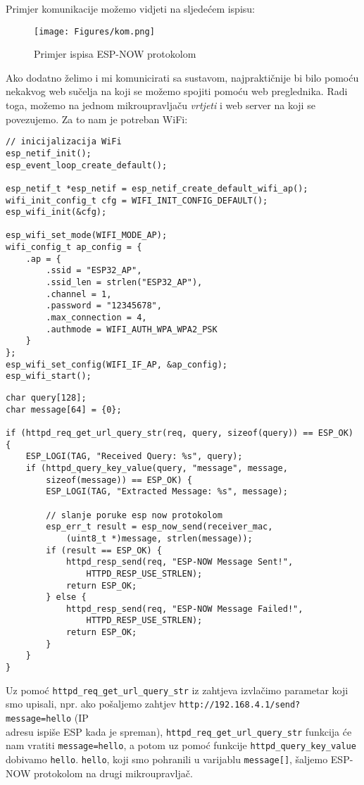 \documentclass[seminarskirad]{fer}
\begin{document}
Primjer komunikacije možemo vidjeti na sljedećem ispisu:

\begin{figure}[h!]
  \centering
  \texttt{[image: Figures/kom.png]} 
  \caption{Primjer ispisa ESP-NOW protokolom}
  \label{slk:kom}
\end{figure}

Ako dodatno želimo i mi komunicirati sa sustavom, najpraktičnije bi bilo pomoću nekakvog web sučelja na koji se možemo spojiti pomoću web preglednika. Radi toga, možemo na jednom mikroupravljaču \textit{vrtjeti} i web server na koji se povezujemo. Za to nam je potreban WiFi:

\begin{lstlisting}[caption=Kreiranje WiFi AP-a]
// inicijalizacija WiFi
esp_netif_init();
esp_event_loop_create_default();

esp_netif_t *esp_netif = esp_netif_create_default_wifi_ap();
wifi_init_config_t cfg = WIFI_INIT_CONFIG_DEFAULT();
esp_wifi_init(&cfg);

esp_wifi_set_mode(WIFI_MODE_AP);
wifi_config_t ap_config = {
    .ap = {
        .ssid = "ESP32_AP",
        .ssid_len = strlen("ESP32_AP"),
        .channel = 1,
        .password = "12345678",
        .max_connection = 4,
        .authmode = WIFI_AUTH_WPA_WPA2_PSK
    }
};
esp_wifi_set_config(WIFI_IF_AP, &ap_config);
esp_wifi_start();
\end{lstlisting}

\begin{lstlisting}[caption=\textit{Handler} za http zahtjev]
char query[128];
char message[64] = {0};
    
if (httpd_req_get_url_query_str(req, query, sizeof(query)) == ESP_OK) {
    ESP_LOGI(TAG, "Received Query: %s", query);
    if (httpd_query_key_value(query, "message", message, 
        sizeof(message)) == ESP_OK) {
        ESP_LOGI(TAG, "Extracted Message: %s", message);

        // slanje poruke esp now protokolom
        esp_err_t result = esp_now_send(receiver_mac, 
            (uint8_t *)message, strlen(message));
        if (result == ESP_OK) {
            httpd_resp_send(req, "ESP-NOW Message Sent!", 
                HTTPD_RESP_USE_STRLEN);
            return ESP_OK;
        } else {
            httpd_resp_send(req, "ESP-NOW Message Failed!", 
                HTTPD_RESP_USE_STRLEN);
            return ESP_OK;
        }
    }
}
\end{lstlisting}

Uz pomoć \verb|httpd_req_get_url_query_str| iz zahtjeva izvlačimo parametar koji smo upisali, npr. ako pošaljemo zahtjev \verb|http://192.168.4.1/send?message=hello| (IP \\ adresu ispiše ESP kada je spreman), \verb|httpd_req_get_url_query_str| funkcija će nam vratiti \verb|message=hello|, a potom uz pomoć funkcije \verb|httpd_query_key_value| dobivamo \verb|hello|. \verb|hello|, koji smo pohranili u varijablu \verb|message[]|, šaljemo ESP-NOW protokolom na drugi mikroupravljač.   
\end{document}
